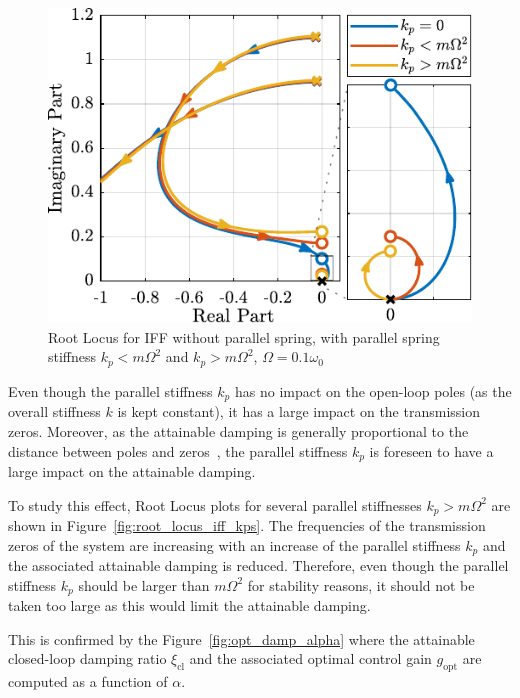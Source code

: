 \documentclass[10pt]{iopart}
\begin{document}
\begin{figure}[htbp]
\centering
\includegraphics[scale=1,scale=0.95]{figs/fig14.pdf}
\caption{\label{fig:root_locus_iff_kp}Root Locus for IFF without parallel spring, with parallel spring stiffness \(k_p < m \Omega^2\) and \(k_p > m \Omega^2\), \(\Omega = 0.1 \omega_0\)}
\end{figure}

\par
Even though the parallel stiffness \(k_p\) has no impact on the open-loop poles (as the overall stiffness \(k\) is kept constant), it has a large impact on the transmission zeros.
Moreover, as the attainable damping is generally proportional to the distance between poles and zeros~\cite{preumont18_vibrat_contr_activ_struc_fourt_edition}, the parallel stiffness \(k_p\) is foreseen to have a large impact on the attainable damping.

To study this effect, Root Locus plots for several parallel stiffnesses \(k_p > m \Omega^2\) are shown in Figure~\ref{fig:root_locus_iff_kps}.
The frequencies of the transmission zeros of the system are increasing with an increase of the parallel stiffness \(k_p\) and the associated attainable damping is reduced.
Therefore, even though the parallel stiffness \(k_p\) should be larger than \(m \Omega^2\) for stability reasons, it should not be taken too large as this would limit the attainable damping.

This is confirmed by the Figure~\ref{fig:opt_damp_alpha} where the attainable closed-loop damping ratio \(\xi_{\text{cl}}\) and the associated optimal control gain \(g_\text{opt}\) are computed as a function of \(\alpha\).
\end{document}
